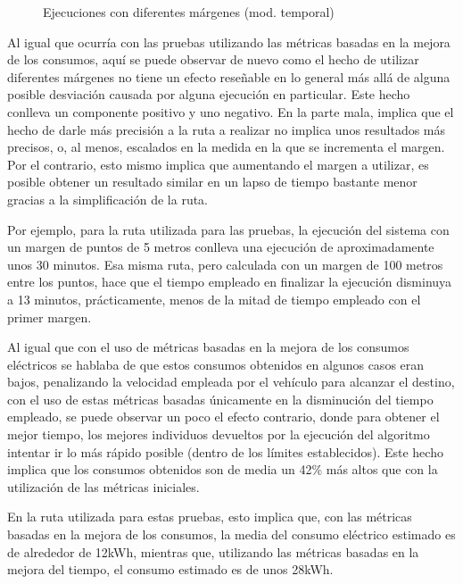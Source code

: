 \documentclass[11pt,spanish,listoffigures,listoftables]{tfgetsinf}
\begin{document}
\begin{figure}[!htb]
    \caption{Ejecuciones con diferentes márgenes (mod. temporal)}
    \label{fig:adv_multi_margin_time}
\end{figure}

Al igual que ocurría con las pruebas utilizando las métricas basadas en la mejora de los consumos, aquí se puede observar de nuevo como el hecho de utilizar diferentes márgenes no tiene un efecto reseñable en lo general más allá de alguna posible desviación causada por alguna ejecución en particular. Este hecho conlleva un componente positivo y uno negativo. En la parte mala, implica que el hecho de darle más precisión a la ruta a realizar no implica unos resultados más precisos, o, al menos, escalados en la medida en la que se incrementa el margen. Por el contrario, esto mismo implica que aumentando el margen a utilizar, es posible obtener un resultado similar en un lapso de tiempo bastante menor gracias a la simplificación de la ruta.

Por ejemplo, para la ruta utilizada para las pruebas, la ejecución del sistema con un margen de puntos de 5 metros conlleva una ejecución de aproximadamente unos 30 minutos. Esa misma ruta, pero calculada con un margen de 100 metros entre los puntos, hace que el tiempo empleado en finalizar la ejecución disminuya a 13 minutos, prácticamente, menos de la mitad de tiempo empleado con el primer margen.

Al igual que con el uso de métricas basadas en la mejora de los consumos eléctricos se hablaba de que estos consumos obtenidos en algunos casos eran bajos, penalizando la velocidad empleada por el vehículo para alcanzar el destino, con el uso de estas métricas basadas únicamente en la disminución del tiempo empleado, se puede observar un poco el efecto contrario, donde para obtener el mejor tiempo, los mejores individuos devueltos por la ejecución del algoritmo intentar ir lo más rápido posible (dentro de los límites establecidos). Este hecho implica que los consumos obtenidos son de media un 42\% más altos que con la utilización de las métricas iniciales.

En la ruta utilizada para estas pruebas, esto implica que, con las métricas basadas en la mejora de los consumos, la media del consumo eléctrico estimado es de alrededor de 12kWh, mientras que, utilizando las métricas basadas en la mejora del tiempo, el consumo estimado es de unos 28kWh.
\end{document}
